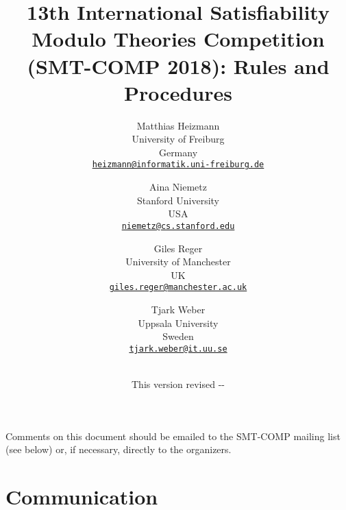 \documentclass[12pt]{article}
\begin{document}
\date{\small This version revised \the\year-\the\month-\the\day}

\title{13th International Satisfiability Modulo Theories Competition
  (SMT-COMP 2018): Rules and Procedures}

\def\doauthor#1{{%
  \hsize.5\hsize \advance\hsize by-1cm %
  \def\\{\hss\egroup\hbox to\hsize\bgroup\strut\hss}%
  \vbox{\hbox to\hsize\bgroup\strut\hss#1\hss\egroup}}}%

\def\header#1{\medskip\noindent\textbf{#1}}

\author{%
Matthias Heizmann \\
University of Freiburg \\
Germany \\
{\small\href{mailto:heizmann@informatik.uni-freiburg.de}{\texttt{heizmann@informatik.uni-freiburg.de}}} \\
\and
Aina Niemetz \\
Stanford University\\
USA\\
{\small\href{mailto:niemetz@cs.stanford.edu}{\texttt{niemetz@cs.stanford.edu}}}\\
\and
Giles Reger \\
University of Manchester \\
UK \\
{\small\href{mailto:giles.reger@manchester.ac.uk}{\texttt{giles.reger@manchester.ac.uk}}} \\
\and
Tjark Weber \\
Uppsala University \\
Sweden \\
{\small\href{mailto:tjark.weber@it.uu.se}{\texttt{tjark.weber@it.uu.se}}} \\
\\
}

\maketitle

\noindent Comments on this document should be emailed to the SMT-COMP
mailing list (see below) or, if necessary, directly to the organizers.


\section{Communication}
\end{document}
